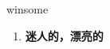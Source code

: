 
\begin{frame}
{\huge winsome}
\begin{center}
\begin{enumerate}\Large
  \item \textbf{迷人的，漂亮的}
\end{enumerate}
\end{center}
\end{frame}
